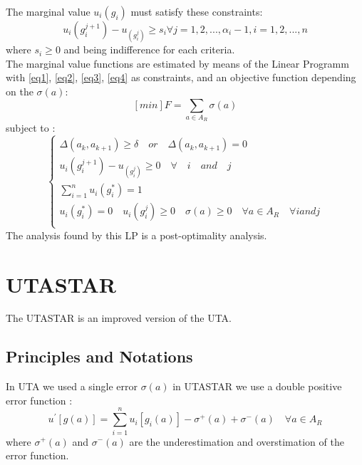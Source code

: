 \documentclass{report}
\begin{document}
The marginal value $u_i (g_i)$ must satisfy these constraints: 
\begin{equation}\label{eq4}
	u_i (g_i^{j+1}) - u_(g_i^{j}) \geq s_i \forall j = 1,2, ..., \alpha _i  - 1, i = 1,2, ..., n 
\end{equation}
where $s_i \geq 0$ and being indifference for each criteria.  \\

The marginal value functions are estimated by means of the Linear Programm with \eqref{eq1}, \eqref{eq2}, \eqref{eq3}, \eqref{eq4} as constraints, and an objective function depending on the $\sigma(a)$: 
$$ [min]F = \sum_{a \in A_R} \sigma(a)  $$
subject to : \\
\begin{equation}
  \left\{
      \begin{aligned}
      	\Delta (a_k, a_{k+1} ) \geq \delta \quad or \quad \Delta (a_k, a_{k+1} ) = 0 \\
       	u_i (g_i^{j+1}) - u_(g_i^{j}) \geq 0 \quad \forall \quad i \quad and \quad j\\
       	\sum_{i=1}^{n} u_i(g_{i}^{*}) = 1\\
	u_i (g_i^{*}) = 0 \quad  u_i(g_i^{j}) \geq 0 \quad  \sigma(a) \geq 0 \quad  \forall a \in A_R\quad  \forall i and j\\
      \end{aligned}
    \right.
\end{equation}
The analysis found by this LP is a post-optimality analysis. 

\section{UTASTAR}
The UTASTAR is an improved version of the UTA. 
\subsection{Principles and Notations}
In UTA we used a single error $\sigma(a)$ in UTASTAR we use a double positive error function : 
\begin{equation}
	u^{'} [g(a)] = \sum_{i=1}^{n} u_i [g_i (a)] - \sigma ^{+} (a)+ \sigma ^{-} (a) \quad  \forall a \in A_R
\end{equation}
where $\sigma ^{+} (a)$ and $\sigma ^{-} (a)$ are the underestimation and overstimation of the error function.\\ 
\end{document}

